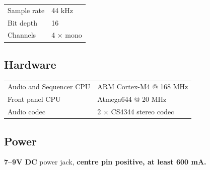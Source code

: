 {\def\LTcaptype{none} %
\begin{longtable}[]{@{}ll@{}}
\toprule\noalign{}
\endhead
\bottomrule\noalign{}
\endlastfoot
Sample rate & 44 kHz \\
Bit depth & 16 \\
Channels & 4 × mono \\
\end{longtable}
}

\subsection{Hardware}\label{hardware}

{\def\LTcaptype{none} %
\begin{longtable}[]{@{}ll@{}}
\toprule\noalign{}
\endhead
\bottomrule\noalign{}
\endlastfoot
Audio and Sequencer CPU & ARM Cortex-M4 @ 168 MHz \\
Front panel CPU & Atmega644 @ 20 MHz \\
Audio codec & 2 × CS4344 stereo codec \\
\end{longtable}
}

\subsection{Power}\label{power}

\textbf{7--9V DC} power jack, \textbf{centre pin positive, at least 600
mA.}
